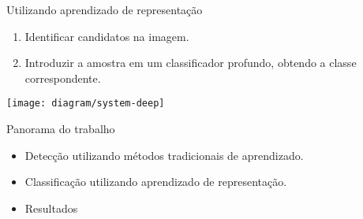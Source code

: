 	\begin{frame}[b]{Utilizando aprendizado de representação}
	\begin{enumerate}
	\item Identificar candidatos na imagem.
	\item Introduzir a amostra em um classificador profundo, obtendo a classe correspondente.
	\end{enumerate}

	\vfill
	\texttt{[image: diagram/system-deep]}
	\end{frame}

	\begin{frame}{Panorama do trabalho}
		\begin{itemize}
			\item Detecção utilizando métodos tradicionais de aprendizado.
			\item Classificação utilizando aprendizado de representação.
			\item Resultados
		\end{itemize}
	\end{frame}
